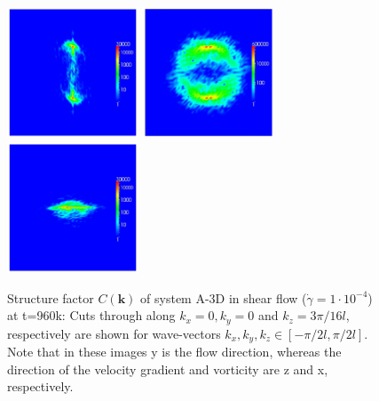 \documentclass[8.5pt,twoside,twocolumn]{article}
\begin{document}
\begin{figure}[htp!]
\centering
\includegraphics[angle=0,width=0.35\textwidth]{ck_x-slice_run788_960.jpg}
\includegraphics[angle=0,width=0.35\textwidth]{ck_y-slice_run788_960.jpg}
\includegraphics[angle=0,width=0.35\textwidth]{ck_z-slice_run788_960.jpg}
\caption{Structure factor $C({\mathbf k})$ of system A-3D in shear flow ($\dot{\gamma}=1\cdot10^{-4}$) at t=960k: Cuts through along $k_x=0,k_y=0$ and $k_z=3\pi/16 l$, respectively are shown for wave-vectors $k_x, k_y, k_z\in[-\pi/2 l,\pi/2 l]$. Note that in these images y is the flow direction, whereas the direction of the velocity gradient and vorticity are z and x, respectively.}
\label{fig14}
\end{figure}
\end{document}

